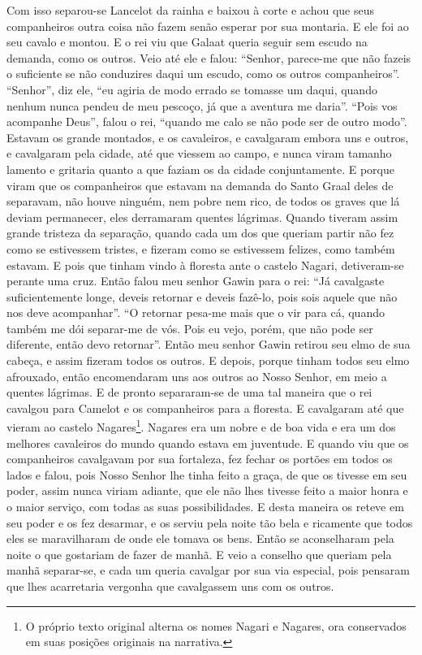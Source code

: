 Com isso separou-se Lancelot da rainha e baixou à corte e achou que seus
companheiros outra coisa não fazem senão esperar por sua montaria. E ele foi ao
seu cavalo e montou. E o rei viu que Galaat queria seguir sem escudo na
demanda, como os outros. Veio até ele e falou: “Senhor, parece-me que não
fazeis o suficiente se não conduzires daqui um escudo, como os outros
companheiros”. “Senhor”, diz ele, “eu agiria de modo errado se tomasse um
daqui, quando nenhum nunca pendeu de meu pescoço, já que a aventura me daria”.
“Pois vos acompanhe Deus”, falou o rei, “quando me calo se não pode ser de
outro modo”. Estavam os grande montados, e os cavaleiros, e cavalgaram
embora uns e outros, e cavalgaram pela cidade, até que viessem ao campo, e
nunca viram tamanho lamento e gritaria quanto a que faziam os da cidade
conjuntamente. E porque viram que os companheiros que estavam na demanda do
Santo Graal deles de separavam, não houve ninguém, nem pobre nem rico, de todos
os graves que lá deviam permanecer, eles derramaram quentes lágrimas. Quando
tiveram assim grande tristeza da separação, quando cada um dos que queriam
partir não fez como se estivessem tristes, e fizeram como se estivessem
felizes, como também estavam. E pois que tinham vindo à floresta ante o castelo
Nagari, detiveram-se perante uma cruz. Então falou meu senhor Gawin para o rei:
“Já cavalgaste suficientemente longe, deveis retornar e deveis fazê-lo, pois
sois aquele que não nos deve acompanhar”. “O retornar pesa-me mais que o vir
para cá, quando também me dói separar-me de vós. Pois eu vejo, porém, que não
pode ser diferente, então devo retornar”. Então meu senhor Gawin
retirou seu elmo de sua cabeça, e assim fizeram todos os outros. E depois,
porque tinham todos seu elmo afrouxado, então encomendaram uns aos outros ao
Nosso Senhor, em meio a quentes lágrimas. E de pronto separaram-se de uma tal
maneira que o rei cavalgou para Camelot e os companheiros para a floresta. E
cavalgaram até que vieram ao castelo Nagares\footnote{ O próprio texto original
alterna os nomes Nagari e Nagares, ora conservados em suas posições originais
na narrativa.}. Nagares era um nobre e de boa vida e era um dos
melhores cavaleiros do mundo quando estava em juventude. E quando viu que os
companheiros cavalgavam por sua fortaleza, fez fechar os portões em todos os
lados e falou, pois Nosso Senhor lhe tinha feito a graça, de que os tivesse em
seu poder, assim nunca viriam adiante, que ele não lhes tivesse feito a maior
honra e o maior serviço, com todas as suas possibilidades. E desta maneira os
reteve em seu poder e os fez desarmar, e os serviu pela noite tão bela e
ricamente que todos eles se maravilharam de onde ele tomava os bens. Então se
aconselharam pela noite o que gostariam de fazer de manhã. E veio a conselho
que queriam pela manhã separar-se, e cada um queria cavalgar por sua via
especial, pois pensaram que lhes acarretaria vergonha que cavalgassem uns com
os outros.

